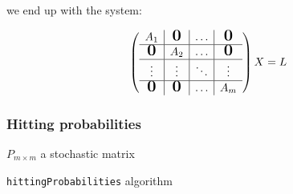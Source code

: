 \begin{frame}
    \fontsize{10pt}{0}\selectfont\bigskip
    
    we end up with the system: \bigskip
    
    \[
    \left(\begin{array}{c|c|c|c}
    A_1 & \mbox{\normalfont\Large\bfseries 0} & \ldots & \mbox{\normalfont\Large\bfseries 0} \\
    \hline
    \mbox{\normalfont\Large\bfseries 0} & A_2 & \ldots & \mbox{\normalfont\Large\bfseries 0} \\
    \hline
    \vdots & \vdots & \ddots & \vdots \\
    \hline
    \mbox{\normalfont\Large\bfseries 0} & \mbox{\normalfont\Large\bfseries 0} & \ldots & A_m
    \end{array}\right) X = L
    \]

\end{frame}

\begin{frame} \frametitle{Hitting probabilities}
    \vspace{2em}
    
    \begin{algorithm}[H]
    \begin{algorithmic}[1]
    \REQUIRE $P_{m \times m}$ a stochastic matrix
    \NEWLINE
    \NEWLINE
        \NEWLINE
            \ENDFOR
        \ENDIF
        \ENDFOR
    \ENDFOR
    \end{algorithmic}
    \caption{\small\texttt{hittingProbabilities} algorithm}
    \label{alg:hittingProbs}
    \end{algorithm}
 
\end{frame}

